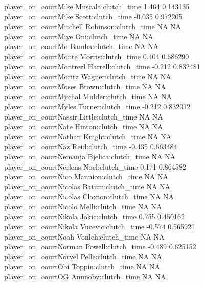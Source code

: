 \documentclass[
  landscape]{article}
\begin{document}
player\_on\_courtMike Muscala:clutch\_time 1.464 0.143135\\
player\_on\_courtMike Scott:clutch\_time -0.035 0.972205\\
player\_on\_courtMitchell Robinson:clutch\_time NA NA\\
player\_on\_courtMiye Oni:clutch\_time NA NA\\
player\_on\_courtMo Bamba:clutch\_time NA NA\\
player\_on\_courtMonte Morris:clutch\_time 0.404 0.686290\\
player\_on\_courtMontrezl Harrell:clutch\_time -0.212 0.832481\\
player\_on\_courtMoritz Wagner:clutch\_time NA NA\\
player\_on\_courtMoses Brown:clutch\_time NA NA\\
player\_on\_courtMychal Mulder:clutch\_time NA NA\\
player\_on\_courtMyles Turner:clutch\_time -0.212 0.832012\\
player\_on\_courtNassir Little:clutch\_time NA NA\\
player\_on\_courtNate Hinton:clutch\_time NA NA\\
player\_on\_courtNathan Knight:clutch\_time NA NA\\
player\_on\_courtNaz Reid:clutch\_time -0.435 0.663484\\
player\_on\_courtNemanja Bjelica:clutch\_time NA NA\\
player\_on\_courtNerlens Noel:clutch\_time 0.171 0.864582\\
player\_on\_courtNico Mannion:clutch\_time NA NA\\
player\_on\_courtNicolas Batum:clutch\_time NA NA\\
player\_on\_courtNicolas Claxton:clutch\_time NA NA\\
player\_on\_courtNicolo Melli:clutch\_time NA NA\\
player\_on\_courtNikola Jokic:clutch\_time 0.755 0.450162\\
player\_on\_courtNikola Vucevic:clutch\_time -0.574 0.565921\\
player\_on\_courtNoah Vonleh:clutch\_time NA NA\\
player\_on\_courtNorman Powell:clutch\_time -0.489 0.625152\\
player\_on\_courtNorvel Pelle:clutch\_time NA NA\\
player\_on\_courtObi Toppin:clutch\_time NA NA\\
player\_on\_courtOG Anunoby:clutch\_time NA NA\\
\end{document}
